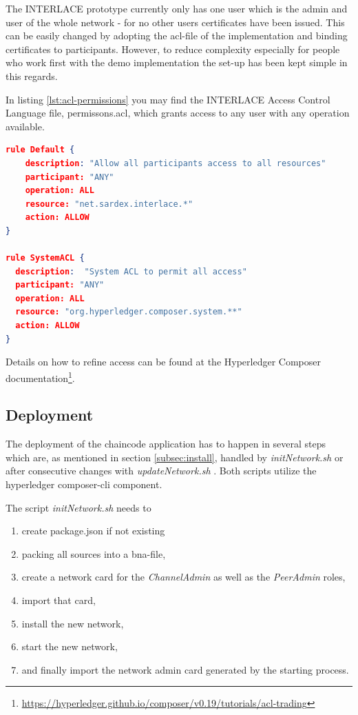 The INTERLACE prototype currently only has one user which is the admin and user of the whole network - for no other users certificates have been issued.  This can be easily changed by adopting the acl-file of the implementation and binding certificates to participants.  However, to reduce complexity especially for people who work first with the demo implementation the set-up has been kept simple in this regards.

In listing \ref{lst:acl-permissions} you may find the INTERLACE Access Control Language file, permissons.acl, which grants access to any user with any operation available.  

\begin{center}
\begin{minipage}{0.8\textwidth}
\small
\begin{lstlisting}[language=json,firstnumber=1,caption={\bf\small access  control configuration for INTERLACE}, captionpos=b,label=lst:acl-permissions]
rule Default {
    description: "Allow all participants access to all resources"
    participant: "ANY"
    operation: ALL
    resource: "net.sardex.interlace.*"
    action: ALLOW
}

rule SystemACL {
  description:  "System ACL to permit all access"
  participant: "ANY"
  operation: ALL
  resource: "org.hyperledger.composer.system.**"
  action: ALLOW
}
\end{lstlisting}
\end{minipage}
\end{center}

Details on how to refine access can be found at the Hyperledger Composer documentation\footnote{\url{https://hyperledger.github.io/composer/v0.19/tutorials/acl-trading}}.

\subsection{Deployment}

The deployment of the chaincode application has to happen in several steps which are, as mentioned in section \ref{subsec:install}, handled by \textit{initNetwork.sh} or after consecutive changes with \textit{updateNetwork.sh} . Both scripts utilize the hyperledger composer-cli component.

The script \textit{initNetwork.sh} needs to

\begin{enumerate}
	\item create package.json if not existing
	\item packing all sources into a bna-file,
	\item create a network card for the \textit{ChannelAdmin} as well as the \textit{PeerAdmin} roles,
	\item import that card,
	\item install the new network,
	\item start the new network,
	\item and finally import the network admin card generated by the starting process.
\end{enumerate}

